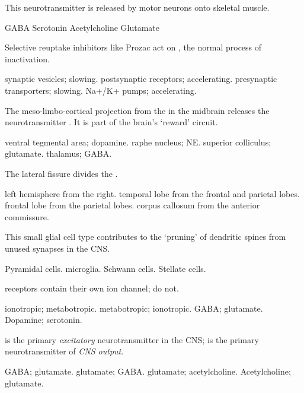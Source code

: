 \documentclass[answers]{exam}
\begin{document}
\begin{questions}
\question This neurotransmitter is released by motor neurons onto skeletal muscle.
\begin{choices}
\choice GABA
\choice Serotonin
\correctchoice Acetylcholine
\choice Glutamate
\end{choices}

\question Selective reuptake inhibitors like Prozac act on \fillin, \fillin the normal process of inactivation.
\begin{choices}
\choice  synaptic vesicles; slowing.
\choice  postsynaptic receptors; accelerating.
\correctchoice  presynaptic transporters; slowing.
\choice  Na+/K+ pumps; accelerating.
\end{choices}

\question The meso-limbo-cortical projection from the \fillin in the midbrain releases the neurotransmitter \fillin. It is part of the brain's `reward' circuit.
\begin{choices}
\correctchoice ventral tegmental area; dopamine.
\choice raphe nucleus; NE.
\choice superior colliculus; glutamate.
\choice thalamus; GABA.
\end{choices}

\newpage

\question The lateral fissure divides the \fillin.
\begin{choices}
\choice left hemisphere from the right.
\correctchoice temporal lobe from the frontal and parietal lobes.
\choice frontal lobe from the parietal lobes.
\choice corpus callosum from the anterior commissure.
\end{choices}

\question This small glial cell type contributes to the `pruning' of dendritic spines from unused synapses in the CNS.
\begin{choices}
\choice Pyramidal cells.
\correctchoice microglia.
\choice Schwann cells.
\choice Stellate cells.
\end{choices}

\question \fillin receptors contain their own ion channel; \fillin do not.
\begin{choices}
\correctchoice ionotropic; metabotropic.
\choice metabotropic; ionotropic.
\choice GABA; glutamate.
\choice Dopamine; serotonin.
\end{choices}

\question \fillin is the primary \emph{excitatory} neurotransmitter in the CNS; \fillin is the primary neurotransmitter of \emph{CNS output}.
\begin{choices}
\choice GABA; glutamate.
\choice glutamate; GABA.
\correctchoice glutamate; acetylcholine.
\choice Acetylcholine; glutamate.
\end{choices}


\end{questions}
\end{document}
